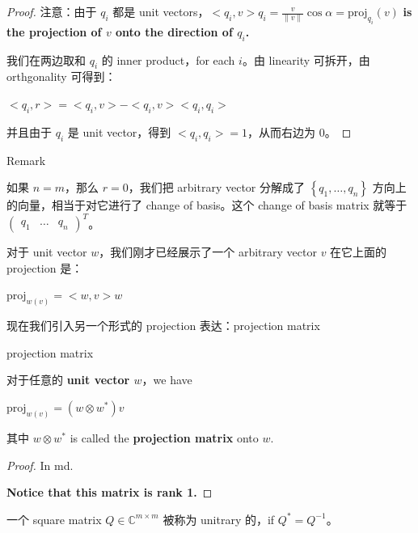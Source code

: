 \begin{proof}

注意：由于 \(q_{i}\) 都是 unit vectors，\(< q_{i},v > q_{i} = \frac{v}{\left\| v \right\|}\cos\alpha = \text{proj}_{q_{i}}(v)\) \textbf{is the projection of \(v\) onto the direction of \(q_{i}\).}

我们在两边取和 \(q_{i}\) 的 inner product，for each \(i\)。由 linearity 可拆开，由 orthgonality 可得到：

\(< q_{i},r > = < q_{i},v > - < q_{i},v > < q_{i},q_{i} >\)

并且由于 \(q_{i}\) 是 unit vector，得到 \(< q_{i},q_{i} > = 1\)，从而右边为 0。

\end{proof}

\begin{qlremark}{Remark}

如果 \(n = m\)，那么 \(r = 0\)，我们把 arbitrary vector 分解成了 \(\left\{ {q_{1},\ldots,q_{n}} \right\}\) 方向上的向量，相当于对它进行了 change of basis。这个 change of basis matrix 就等于 \(\begin{pmatrix}
q_{1} & \ldots & q_{n}
\end{pmatrix}^{T}\)。

\end{qlremark}

对于 unit vector \(w\)，我们刚才已经展示了一个 arbitrary vector \(v\) 在它上面的 projection 是：

\(\text{proj}_{w{(v)}} = < w,v > w\)

现在我们引入另一个形式的 projection 表达：projection matrix

\begin{theorem}{projection matrix}

对于任意的 \textbf{unit vector \(w\)}，we have

\(\text{proj}_{w{(v)}} = \left( {w \otimes w^{\ast}} \right)v\)

其中 \(w \otimes w^{\ast}\) is called the \textbf{projection matrix} onto \(w\).

\end{theorem}

\begin{proof}

In md.

\textbf{Notice that this matrix is rank 1.}

\end{proof}

\begin{definition}{}

一个 square matrix \(Q \in \mathbb{C}^{m \times m}\) 被称为 unitrary 的，if \(Q^{\ast} = Q^{- 1}\)。

\end{definition}

